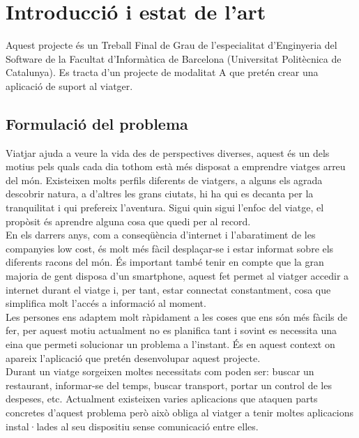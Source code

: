 
\chapter{Introducció i estat de l'art} %

\label{Context} %

Aquest projecte és un Treball Final de Grau de l'especialitat d'Enginyeria del Software de la Facultat d'Informàtica de Barcelona (Universitat Politècnica de Catalunya). Es tracta d'un projecte de modalitat A que pretén crear una aplicació de suport al viatger.


\section{Formulació del problema}

Viatjar ajuda a veure la vida des de perspectives diverses, aquest és un dels motius pels quals cada dia tothom està més disposat a emprendre viatges arreu del món. Existeixen molts perfils diferents de viatgers, a alguns els agrada descobrir natura, a d’altres les grans ciutats, hi ha qui es decanta per la tranquilitat i qui prefereix l’aventura. Sigui quin sigui l’enfoc del viatge, el propòsit és aprendre alguna cosa que quedi per al record.\\

En els darrers anys, com a conseqüència d’internet i l’abaratiment de les companyies low cost, és molt més fàcil desplaçar-se i estar informat sobre els diferents racons del món. És important també tenir en compte que la gran majoria de gent disposa d’un smartphone, aquest fet permet al viatger accedir a internet durant el viatge i, per tant, estar connectat constantment, cosa que simplifica molt l’accés a informació al moment.\\

Les persones ens adaptem molt ràpidament a les coses que ens són més fàcils de fer, per aquest motiu actualment no es planifica tant i sovint es necessita una eina que permeti solucionar un problema a l’instant. És en aquest context on apareix l’aplicació que pretén desenvolupar aquest projecte.\\

Durant un viatge sorgeixen moltes necessitats com poden ser: buscar un restaurant, informar-se del temps, buscar transport, portar un control de les despeses, etc. Actualment existeixen varies aplicacions que ataquen parts concretes d’aquest problema però això obliga al viatger a tenir moltes aplicacions instal·lades al seu dispositiu sense comunicació entre elles.\\

